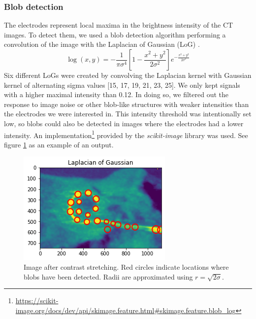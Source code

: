 \documentclass[a4paper, 10pt, twocolumn]{article}
\begin{document}
\subsubsection{Blob detection}
The electrodes represent local maxima in the brightness intensity of the CT images. To detect them, we used a blob detection algorithm performing a convolution of the image with the Laplacian of Gaussian (LoG) \cite{LoG}. 
$$
\log(x, y)=-\frac{1}{\pi \sigma^{4}}\left[1-\frac{x^{2}+y^{2}}{2 \sigma^{2}}\right] e^{-\frac{x^{2}+y^{2}}{2 \sigma^{2}}}
$$
Six different LoGs were created by convolving the Laplacian kernel with Gaussian kernel of alternating sigma values [15, 17, 19, 21, 23, 25]. We only kept signals with a higher maximal intensity than 0.12. In doing so, we filtered out the response to image noise or other blob-like structures with weaker intensities than the electrodes we were interested in. This intensity threshold was intentionally set low, so blobs could also be detected in images where the electrodes had a lower intensity. An implementation\footnote{\url{https://scikit-image.org/docs/dev/api/skimage.feature.html#skimage.feature.blob_log}}
provided by the \emph{scikit-image} \cite{scikit-image} library was used.
See figure \ref{blobs_detected} as an example of an output.
\begin{figure}[ht]
	\centering
  \includegraphics[width=.5\textwidth]{blobs_detected.png}
	\caption{Image after contrast stretching. Red circles indicate locations where blobs have been detected. Radii are approximated using $r=\sqrt{2 \sigma }$.}
	\label{blobs_detected}
\end{figure}
\end{document}
